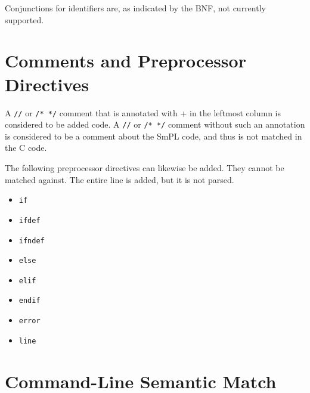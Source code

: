 \begin{grammar}
  \CASE{[0-9]+}
  \CASE{\mth{\cdots}}






\end{grammar}

Conjunctions for identifiers are, as indicated by the BNF, not currently
supported.

\section{Comments and Preprocessor Directives}

A \verb+//+ or \verb+/* */+ comment that is annotated with + in the
leftmost column is considered to be added code.  A \verb+//+ or
\verb+/* */+ comment without such an annotation is considered to be a
comment about the SmPL code, and thus is not matched in the C code.

The following preprocessor directives can likewise be added.  They cannot
be matched against.  The entire line is added, but it is not parsed.

\begin{itemize}
\item \verb+if+
\item \verb+ifdef+
\item \verb+ifndef+
\item \verb+else+
\item \verb+elif+
\item \verb+endif+
\item \verb+error+
\item \verb+line+
\end{itemize}

\section{Command-Line Semantic Match}

